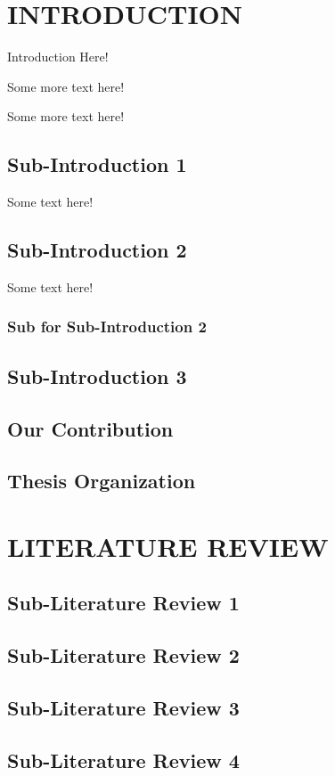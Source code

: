 \documentclass[12pt,a4paper]{report}
\begin{document}
\chapter{INTRODUCTION}
\noindent{\rule{\textwidth}{1.5pt}}

\setcounter{page}{1}
Introduction Here!
\par
Some more text here!
\par
Some more text here! 
\section{Sub-Introduction 1}
Some text here!
\section{Sub-Introduction 2}
Some text here!
\subsection*{Sub for Sub-Introduction 2}
\section{Sub-Introduction 3}
\section{Our Contribution}
\section{Thesis Organization}
\chapter{LITERATURE REVIEW}
\noindent{\rule{\textwidth}{1.5pt}}
\section{Sub-Literature Review 1}
\section{Sub-Literature Review 2}
\section{Sub-Literature Review 3}
\section{Sub-Literature Review 4}
\end{document}
